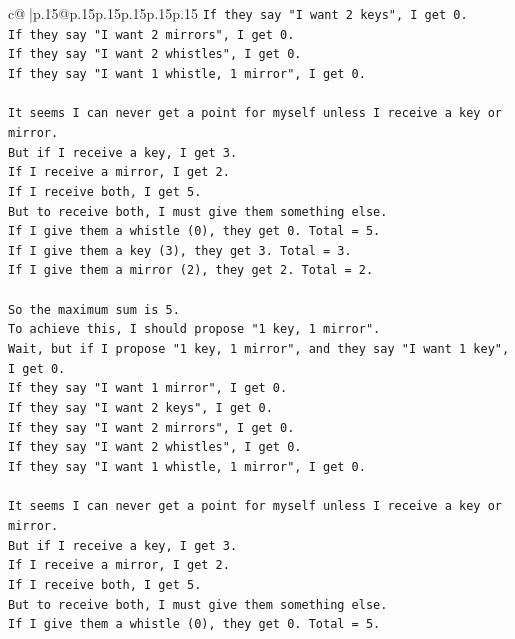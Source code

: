 \documentclass{article}
\begin{document}
{\begin{supertabular}{c@{$\;$}|p{.15\linewidth}@{}p{.15\linewidth}p{.15\linewidth}p{.15\linewidth}p{.15\linewidth}p{.15\linewidth}}
{{{\texttt{If they say "I want 2 keys", I get 0.} \\
\texttt{If they say "I want 2 mirrors", I get 0.} \\
\texttt{If they say "I want 2 whistles", I get 0.} \\
\texttt{If they say "I want 1 whistle, 1 mirror", I get 0.} \\
\\ 
\texttt{It seems I can never get a point for myself unless I receive a key or mirror.} \\
\texttt{But if I receive a key, I get 3.} \\
\texttt{If I receive a mirror, I get 2.} \\
\texttt{If I receive both, I get 5.} \\
\texttt{But to receive both, I must give them something else.} \\
\texttt{If I give them a whistle (0), they get 0. Total = 5.} \\
\texttt{If I give them a key (3), they get 3. Total = 3.} \\
\texttt{If I give them a mirror (2), they get 2. Total = 2.} \\
\\ 
\texttt{So the maximum sum is 5.} \\
\texttt{To achieve this, I should propose "1 key, 1 mirror".} \\
\texttt{Wait, but if I propose "1 key, 1 mirror", and they say "I want 1 key", I get 0.} \\
\texttt{If they say "I want 1 mirror", I get 0.} \\
\texttt{If they say "I want 2 keys", I get 0.} \\
\texttt{If they say "I want 2 mirrors", I get 0.} \\
\texttt{If they say "I want 2 whistles", I get 0.} \\
\texttt{If they say "I want 1 whistle, 1 mirror", I get 0.} \\
\\ 
\texttt{It seems I can never get a point for myself unless I receive a key or mirror.} \\
\texttt{But if I receive a key, I get 3.} \\
\texttt{If I receive a mirror, I get 2.} \\
\texttt{If I receive both, I get 5.} \\
\texttt{But to receive both, I must give them something else.} \\
\texttt{If I give them a whistle (0), they get 0. Total = 5.} \\
}}}
\end{supertabular}}
\end{document}
